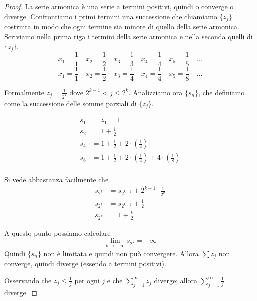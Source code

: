 \begin{proof}
La serie armonica è una serie a termini positivi, quindi o converge o diverge. Confrontiamo i primi termini una successione che chiamiamo $\{z_j\}$ costruita in modo che ogni termine sia minore di quello della serie armonica. Scriviamo nella prima riga i termini della serie armonica e nella seconda quelli di $\{z_j\}$:
\begin{equation*}
x_1 = \frac{1}{1} \quad x_2 = \frac{1}{2} \quad x_3 = \frac{1}{3} \quad x_4 = \frac{1}{4} \quad x_5 = \frac{1}{5} \quad \ldots 
\end{equation*}
\begin{equation*}
x_1 = \frac{1}{1} \quad x_2 = \frac{1}{2} \quad x_3 = \frac{1}{4} \quad x_4 = \frac{1}{4} \quad x_5 = \frac{1}{8} \quad \ldots 
\end{equation*}

Formalmente $z_j = \frac{1}{2^k}$ dove $2^{k-1} < j \le 2^k$. Analizziamo ora $\{s_n\}$, che definiamo come la successione delle somme parziali di $\{z_j\}$.

\begin{align*}
s_1 &= z_1 = 1 \\
s_2 &= 1 + \frac{1}{2} \\
s_4 &= 1 + \frac{1}{2} + 2 \cdot \left(\frac{1}{4}\right) \\
s_8 &= 1 + \frac{1}{2} + 2 \cdot \left(\frac{1}{4}\right) + 4 \cdot \left(\frac{1}{8}\right)\\
\end{align*}

Si vede abbastanza facilmente che
\begin{align*}
s_{2^k} &= s_{2^{k-1}} + 2^{k-1} \cdot \frac{1}{2^k} \\
s_{2^k} &= s_{2^{k-1}} + \frac{1}{2} \\
s_{2^k} &= 1 + \frac{k}{2}
\end{align*}

A questo punto possiamo calcolare 
\begin{equation*}
\lim_{k \to +\infty} s_{2^k} = +\infty
\end{equation*}
Quindi $\{s_n\}$ non è limitata e quindi non può convergere. Allora $\sum z_j$ non converge, quindi diverge (essendo a termini positivi).

Osservando che $z_j \le \frac{1}{j}$ per ogni $j$ e che $\sum_{j=1}^\infty z_j$ diverge; allora $\sum_{j=1}^\infty \frac{1}{j}$ diverge.

\end{proof}


